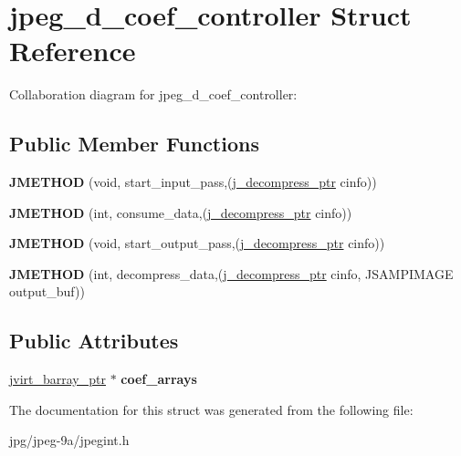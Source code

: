 \hypertarget{structjpeg__d__coef__controller}{\section{jpeg\+\_\+d\+\_\+coef\+\_\+controller Struct Reference}
\label{structjpeg__d__coef__controller}
}


Collaboration diagram for jpeg\+\_\+d\+\_\+coef\+\_\+controller\+:
\subsection*{Public Member Functions}
\begin{DoxyCompactItemize}
\item 
\hypertarget{structjpeg__d__coef__controller_ab4b18cfac761c7186363a845e36f342c}{{\bfseries J\+M\+E\+T\+H\+O\+D} (void, start\+\_\+input\+\_\+pass,(\hyperlink{structjpeg__decompress__struct}{j\+\_\+decompress\+\_\+ptr} cinfo))}\label{structjpeg__d__coef__controller_ab4b18cfac761c7186363a845e36f342c}

\item 
\hypertarget{structjpeg__d__coef__controller_a4c0e8d307e0852eae338a0f4f3c96edb}{{\bfseries J\+M\+E\+T\+H\+O\+D} (int, consume\+\_\+data,(\hyperlink{structjpeg__decompress__struct}{j\+\_\+decompress\+\_\+ptr} cinfo))}\label{structjpeg__d__coef__controller_a4c0e8d307e0852eae338a0f4f3c96edb}

\item 
\hypertarget{structjpeg__d__coef__controller_addb7a363607be97630bf37175267fd58}{{\bfseries J\+M\+E\+T\+H\+O\+D} (void, start\+\_\+output\+\_\+pass,(\hyperlink{structjpeg__decompress__struct}{j\+\_\+decompress\+\_\+ptr} cinfo))}\label{structjpeg__d__coef__controller_addb7a363607be97630bf37175267fd58}

\item 
\hypertarget{structjpeg__d__coef__controller_a5d61ba56d9f5d8de0662df091aa6d9e1}{{\bfseries J\+M\+E\+T\+H\+O\+D} (int, decompress\+\_\+data,(\hyperlink{structjpeg__decompress__struct}{j\+\_\+decompress\+\_\+ptr} cinfo, J\+S\+A\+M\+P\+I\+M\+A\+G\+E output\+\_\+buf))}\label{structjpeg__d__coef__controller_a5d61ba56d9f5d8de0662df091aa6d9e1}

\end{DoxyCompactItemize}
\subsection*{Public Attributes}
\begin{DoxyCompactItemize}
\item 
\hypertarget{structjpeg__d__coef__controller_a6611f9e18fbbbb13d117caadb5d14dc1}{\hyperlink{structjvirt__barray__control}{jvirt\+\_\+barray\+\_\+ptr} $\ast$ {\bfseries coef\+\_\+arrays}}\label{structjpeg__d__coef__controller_a6611f9e18fbbbb13d117caadb5d14dc1}

\end{DoxyCompactItemize}


The documentation for this struct was generated from the following file\+:\begin{DoxyCompactItemize}
\item 
jpg/jpeg-\/9a/jpegint.\+h\end{DoxyCompactItemize}
